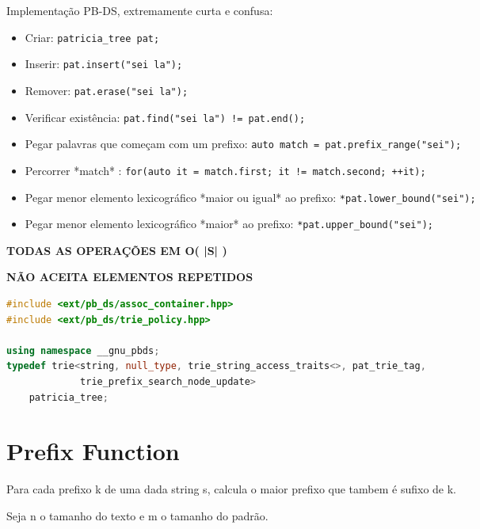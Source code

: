 \documentclass[11pt, a4paper, oneside]{book}
\begin{document}
Implementação PB-DS, extremamente curta e confusa:



\begin{itemize}
\item Criar: \lstinline{patricia_tree pat;}
\item Inserir: \lstinline{pat.insert("sei la");}
\item Remover: \lstinline{pat.erase("sei la");}
\item Verificar existência: \lstinline{pat.find("sei la") != pat.end();}
\item Pegar palavras que começam com um prefixo: \lstinline{auto match = pat.prefix_range("sei");}
\item Percorrer *match* : \lstinline{for(auto it = match.first; it != match.second; ++it);}
\item Pegar menor elemento lexicográfico *maior ou igual* ao prefixo: \lstinline{*pat.lower_bound("sei");}
\item Pegar menor elemento lexicográfico *maior* ao prefixo: \lstinline{*pat.upper_bound("sei");}
\end{itemize}



\textbf{TODAS AS OPERAÇÕES EM O( |S| )}  

\textbf{NÃO ACEITA ELEMENTOS REPETIDOS}

\hfill

\begin{multicols}{2}
\begin{lstlisting}[language=C++]
#include <ext/pb_ds/assoc_container.hpp>
#include <ext/pb_ds/trie_policy.hpp>

using namespace __gnu_pbds;
typedef trie<string, null_type, trie_string_access_traits<>, pat_trie_tag,
             trie_prefix_search_node_update>
    patricia_tree;
\end{lstlisting}
\end{multicols}

\hfill

\section{Prefix Function}


Para cada prefixo k de uma dada string s, calcula o maior prefixo que tambem é sufixo de k.



Seja n o tamanho do texto e m o tamanho do padrão.
\end{document}
